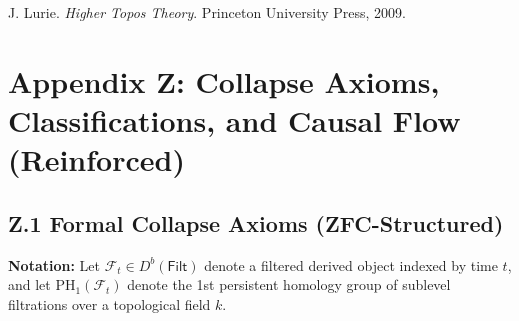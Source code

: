 \documentclass[11pt]{article}
\begin{document}
\begin{axiom}
\begin{axiom}
{{\begin{thebibliography}{9}
J. Lurie.  
\textit{Higher Topos Theory}. Princeton University Press, 2009.

\end{thebibliography}



\section*{Appendix Z: Collapse Axioms, Classifications, and Causal Flow (Reinforced)}

\subsection*{Z.1 Formal Collapse Axioms (ZFC-Structured)}

\textbf{Notation:} Let \( \mathcal{F}_t \in D^b(\mathsf{Filt}) \) denote a filtered derived object indexed by time \( t \),  
and let \( \mathrm{PH}_1(\mathcal{F}_t) \) denote the 1st persistent homology group of sublevel filtrations over a topological field \( k \).  

}}
\end{axiom}
\end{axiom}
\end{document}
